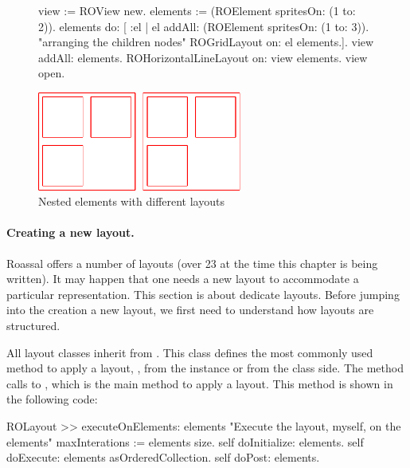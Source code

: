 \documentclass[a4paper,10pt,twoside]{book}
\begin{document}
\begin{figure}[H]
      \begin{minipage}[t]{0.61\textwidth}
      \vspace{0pt}
     \begin{code}{}
view := ROView new.
elements := (ROElement spritesOn: (1 to: 2)).
elements 
   do: [ :el | el addAll: (ROElement spritesOn: (1 to: 3)). 
	           "arranging the children nodes"
			   ROGridLayout on: el elements.].			   
view addAll: elements.
ROHorizontalLineLayout on: view elements.
view open.
  \end{code}
   \end{minipage}
   \hfill
   \begin{minipage}[t]{0.45\textwidth}
      \vspace{0pt}\raggedright
       \centering
		\includegraphics[width=0.6\textwidth]{nestedLayout}
   \end{minipage}
\label{fig:nestedLayout}
\caption{Nested elements with different layouts }
\end{figure} 


\paragraph{Creating a new layout.}

Roassal offers a number of layouts (over 23 at the time this chapter is being written). It may happen that one needs a new layout to accommodate a particular representation. This section is about dedicate layouts.
Before jumping into the creation a new layout, we first need to understand how layouts are structured.

All layout classes inherit from . 
This class defines the most commonly used method to apply a layout, , from the instance or from the class side. The method  calls to , which is the main method to apply a layout. This method is shown in the following code:

\begin{code}{}
ROLayout >> executeOnElements: elements 
	"Execute the layout, myself, on the elements"	
	maxInterations := elements size.
	self doInitialize: elements.
	self doExecute: elements asOrderedCollection.
	self doPost: elements.
\end{code}
\end{document}
